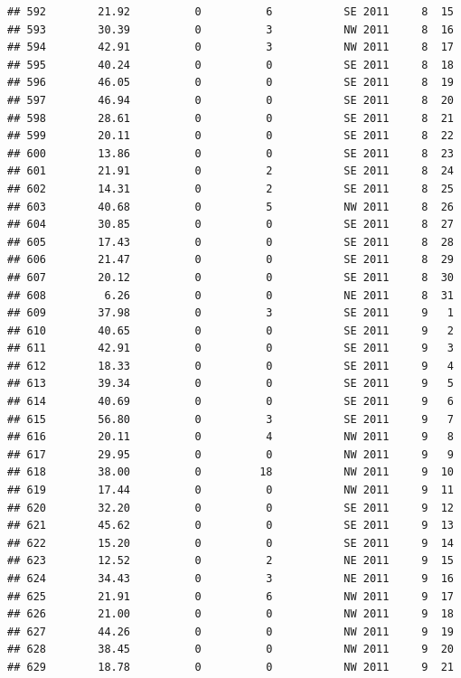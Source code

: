 \documentclass[
]{article}
\begin{document}
\begin{verbatim}
## 592        21.92          0          6           SE 2011     8  15
## 593        30.39          0          3           NW 2011     8  16
## 594        42.91          0          3           NW 2011     8  17
## 595        40.24          0          0           SE 2011     8  18
## 596        46.05          0          0           SE 2011     8  19
## 597        46.94          0          0           SE 2011     8  20
## 598        28.61          0          0           SE 2011     8  21
## 599        20.11          0          0           SE 2011     8  22
## 600        13.86          0          0           SE 2011     8  23
## 601        21.91          0          2           SE 2011     8  24
## 602        14.31          0          2           SE 2011     8  25
## 603        40.68          0          5           NW 2011     8  26
## 604        30.85          0          0           SE 2011     8  27
## 605        17.43          0          0           SE 2011     8  28
## 606        21.47          0          0           SE 2011     8  29
## 607        20.12          0          0           SE 2011     8  30
## 608         6.26          0          0           NE 2011     8  31
## 609        37.98          0          3           SE 2011     9   1
## 610        40.65          0          0           SE 2011     9   2
## 611        42.91          0          0           SE 2011     9   3
## 612        18.33          0          0           SE 2011     9   4
## 613        39.34          0          0           SE 2011     9   5
## 614        40.69          0          0           SE 2011     9   6
## 615        56.80          0          3           SE 2011     9   7
## 616        20.11          0          4           NW 2011     9   8
## 617        29.95          0          0           NW 2011     9   9
## 618        38.00          0         18           NW 2011     9  10
## 619        17.44          0          0           NW 2011     9  11
## 620        32.20          0          0           SE 2011     9  12
## 621        45.62          0          0           SE 2011     9  13
## 622        15.20          0          0           SE 2011     9  14
## 623        12.52          0          2           NE 2011     9  15
## 624        34.43          0          3           NE 2011     9  16
## 625        21.91          0          6           NW 2011     9  17
## 626        21.00          0          0           NW 2011     9  18
## 627        44.26          0          0           NW 2011     9  19
## 628        38.45          0          0           NW 2011     9  20
## 629        18.78          0          0           NW 2011     9  21

\end{verbatim}
\end{document}
